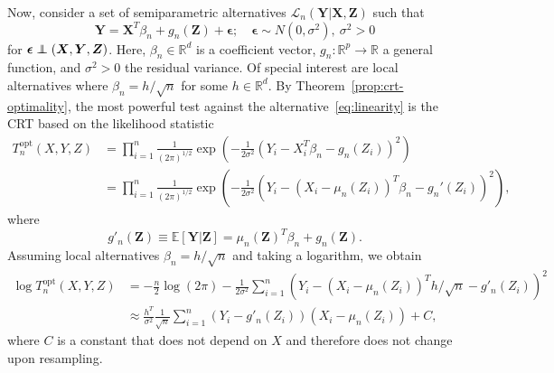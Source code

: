 \documentclass[12pt]{article}
\theoremstyle{definition}
\theoremstyle{remark}
\def\independenT#1#2{\mathrel{\rlap{$#1#2$}\mkern2mu{#1#2}}}
\newcommand\independent{\protect\mathpalette{\protect\independenT}{\perp}}
\newcommand{\prx}{\bm X}
\newcommand{\srx}{X}
\newcommand{\prz}{\bm Z}
\newcommand{\srz}{Z}
\newcommand{\pry}{{\bm Y}}
\newcommand{\sry}{Y}
\newcommand{\peps}{\bm \epsilon}
\begin{document}
Now, consider a set of semiparametric alternatives $\mathcal L_n(\pry|\prx,\prz)$ such that
\begin{equation}
	\pry = \prx^T \beta_n + g_n(\prz) + \peps; \quad \peps \sim N(0, \sigma^2 ),\ \sigma^2 > 0
	\label{eq:linearity}
\end{equation}
for $\peps \independent (\prx, \pry, \prz)$. Here, $\beta_n \in \mathbb R^d$ is a coefficient vector, $g_n: \mathbb R^p \rightarrow \mathbb R$ a general function, and $\sigma^2 > 0$ the residual variance. Of special interest are local alternatives where $\beta_n = h/\sqrt{n}$ for some $h \in \mathbb R^d$. By Theorem~\ref{prop:crt-optimality}, the most powerful test against the alternative~\eqref{eq:linearity} is the CRT based on the likelihood statistic 
\begin{equation}
\begin{split}
T_n^{\text{opt}}(\srx, \sry, \srz) &= \prod_{i = 1}^n\frac{1}{(2\pi)^{1/2}}\exp\left(-\frac{1}{2\sigma^2}\left(\sry_i - \srx_i^T \beta_n - g_n(\srz_i)\right)^2\right) \\
&=\prod_{i = 1}^n\frac{1}{(2\pi)^{1/2}}\exp\left(-\frac{1}{2\sigma^2}\left(\sry_i - (\srx_i-\mu_n(\srz_i))^T \beta_n - g_n'(\srz_i)\right)^2\right),
\label{eq:likelihood-ratio}
\end{split}
\end{equation}
where
\begin{equation}
g'_n(\prz) \equiv \mathbb E[\pry|\prz] =  \mu_n(\prz)^T\beta_n  + g_n(\prz).
\label{eq:g-n-prime-def}
\end{equation}
Assuming local alternatives $\beta_n = h/\sqrt n$ and taking a logarithm, we obtain
\begin{equation}
	\begin{split}
		\log T_n^{\text{opt}}(\srx, \sry, \srz) &= -\frac n 2 \log(2\pi) - \frac{1}{2\sigma^2}\sum_{i = 1}^n\left(\sry_i - (\srx_i-\mu_n(\srz_i))^T h/\sqrt{n} - g'_n(\srz_i)\right)^2 \\
		&\approx   \frac{h^T}{\sigma^2}\frac{1}{\sqrt{n}}\sum_{i = 1}^n(\sry_i - g'_n(\srz_i))(\srx_i-\mu_n(\srz_i)) + C,
	\end{split}
\label{eq:optimal-semiparametric}
\end{equation}
where $C$ is a constant that does not depend on $\srx$ and therefore does not change upon resampling. 
\end{document}
